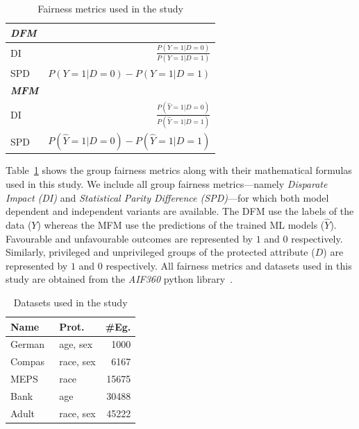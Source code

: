 \documentclass[conference,review,anonymous]{IEEEtran}
\begin{document}
\begin{table}
  \centering
  \caption{Fairness metrics used in the study}
  \begin{tabular}{l r}
    \hline
    \textbf{\emph{DFM}}\\
    \hline
    DI & \(\displaystyle \frac{P(Y=1|D=0)}{P(Y=1|D=1)}\)\\
    SPD & \(\displaystyle P(Y=1|D=0)-P(Y=1|D=1)\)\\
    \hline
    \textbf{\emph{MFM}}\\
    \hline
    DI & \(\displaystyle \frac{P(\hat{Y}=1|D=0)}{P(\hat{Y}=1|D=1)}\)\\
    SPD & \(\displaystyle P(\hat{Y}=1|D=0)-P(\hat{Y}=1|D=1)\)\\
    \hline
  \end{tabular}
  \label{tab:fairness-metrics}
\end{table}

Table \ref{tab:fairness-metrics} shows the group fairness metrics
along with their mathematical formulas used in this study. We include
all group fairness metrics---namely \emph{Disparate Impact (DI)} and
\emph{Statistical Parity Difference (SPD)}---for which both model
dependent and independent variants are available. The DFM use the
labels of the data ($Y$) whereas the MFM use the predictions of the
trained ML models ($\hat{Y}$). Favourable and unfavourable outcomes
are represented by $1$ and $0$ respectively. Similarly, privileged and
unprivileged groups of the protected attribute ($D$) are represented
by $1$ and $0$ respectively. All fairness metrics and datasets used in
this study are obtained from the \emph{AIF360} python
library \cite{bellamy2019ai}.

\begin{table}
  \centering
  \caption{Datasets used in the study}
  \begin{tabular}{l l r}
    \hline
    \textbf{Name} & \textbf{Prot.} & \textbf{\#Eg.}\\
    \hline
    German \cite{hofmann1994german} & age, sex & 1000\\
    Compas\cite{angwin2016machine} & race, sex & 6167\\
    MEPS \cite{mepsdata} & race & 15675\\
    Bank\cite{moro2014data} & age & 30488\\
    Adult\cite{kohavi1996scaling} & race, sex & 45222\\
    \hline
  \end{tabular}
  \label{tab:datasets}
\end{table}
\end{document}
